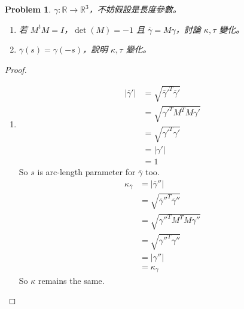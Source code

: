 \documentclass[10pt,a4paper]{article}
\newcounter{theProblemCounter}
\newtheorem{problem}[theProblemCounter]{Problem}
\begin{document}
\setcounter{theProblemCounter}{6}
\begin{problem}
$\gamma:\mathbb{R}\to\mathbb{R}^3$，不妨假設是長度參數。
\begin{enumerate}
\item[(b)] 若 $M^tM=I$，$\det(M)=-1$ 且 $\overline{\gamma}=M\gamma$，討論 $\kappa, \tau$ 變化。
\item[(c)] $\overline{\gamma}(s)=\gamma(-s)$，說明 $\kappa, \tau$ 變化。
\end{enumerate}
\end{problem}
\begin{proof}
\begin{enumerate}
\item[(b)]
\begin{align*}
\left|\overline{\gamma}'\right|&=\sqrt{\overline{\gamma}'^T\overline{\gamma}'}\\
&=\sqrt{\gamma'^TM^TM\gamma'}\\
&=\sqrt{\gamma'^T\gamma'}\\
&=\left|\gamma'\right|\\
&=1
\end{align*}
So $s$ is arc-length parameter for $\overline{\gamma}$ too.\\
\begin{align*}
\kappa_{\overline{\gamma}}&=\left|\overline{\gamma}''\right|\\
&=\sqrt{\overline{\gamma}''^T\overline{\gamma}''}\\
&=\sqrt{\gamma''^TM^TM\gamma''}\\
&=\sqrt{\gamma''^T\gamma''}\\
&=\left|\gamma''\right|\\
&=\kappa_{\gamma}
\end{align*}
So $\kappa$ remains the same.


\end{enumerate}
\end{proof}
\end{document}
